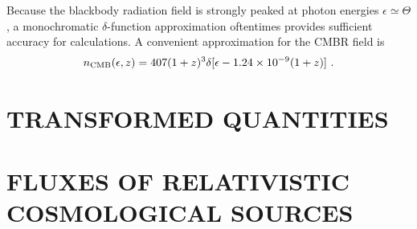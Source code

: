 \documentclass[12pt,a4paper]{article}
\begin{document}
Because the blackbody radiation field is strongly peaked at photon energies $\epsilon \simeq \Theta$, a monochromatic $\delta$-function approximation oftentimes provides sufficient accuracy for calculations. A convenient approximation for the CMBR field is
\begin{align}
n_{\rm CMB} (\epsilon, z) = 407(1+z)^3 \delta[\epsilon -1.24 \times 10^{-9}(1+z)] ~.
\end{align}



\section{TRANSFORMED QUANTITIES}
\cite{2009herb.book.....D} 

























\section{FLUXES OF RELATIVISTIC COSMOLOGICAL SOURCES}
\cite{2009herb.book.....D} 































\end{document}
